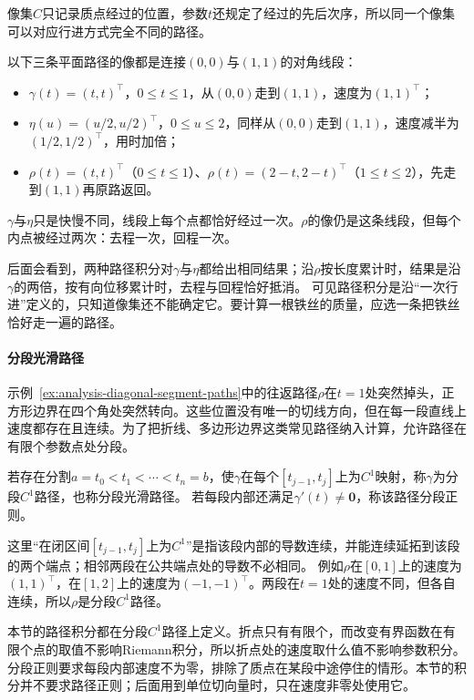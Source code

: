 像集$C$只记录质点经过的位置，参数$t$还规定了经过的先后次序，所以同一个像集可以对应行进方式完全不同的路径。
\begin{example}[同一条对角线段上的三条路径]
\label{ex:analysis-diagonal-segment-paths}
以下三条平面路径的像都是连接$(0,0)$与$(1,1)$的对角线段：
\begin{itemize}
 \item $\gamma(t)=(t,t)^\top$，$0\leq t\leq1$，从$(0,0)$走到$(1,1)$，速度为$(1,1)^\top$；
 \item $\eta(u)=(u/2,u/2)^\top$，$0\leq u\leq2$，同样从$(0,0)$走到$(1,1)$，速度减半为$(1/2,1/2)^\top$，用时加倍；
 \item $\rho(t)=(t,t)^\top$（$0\leq t\leq1$）、$\rho(t)=(2-t,2-t)^\top$（$1\leq t\leq2$），先走到$(1,1)$再原路返回。
\end{itemize}
$\gamma$与$\eta$只是快慢不同，线段上每个点都恰好经过一次。$\rho$的像仍是这条线段，但每个内点被经过两次：去程一次，回程一次。
\end{example}

后面会看到，两种路径积分对$\gamma$与$\eta$都给出相同结果；沿$\rho$按长度累计时，结果是沿$\gamma$的两倍，按有向位移累计时，去程与回程恰好抵消。
可见路径积分是沿“一次行进”定义的，只知道像集还不能确定它。要计算一根铁丝的质量，应选一条把铁丝恰好走一遍的路径。

\paragraph{分段光滑路径}

示例~\ref{ex:analysis-diagonal-segment-paths}中的往返路径$\rho$在$t=1$处突然掉头，正方形边界在四个角处突然转向。这些位置没有唯一的切线方向，但在每一段直线上速度都存在且连续。为了把折线、多边形边界这类常见路径纳入计算，允许路径在有限个参数点处分段。
\begin{definition}[分段光滑路径]
若存在分割$a=t_0<t_1<\cdots<t_n=b$，使$\gamma$在每个$[t_{j-1},t_j]$上为$C^1$映射，称$\gamma$为分段$C^1$路径，也称分段光滑路径。
若每段内部还满足$\gamma'(t)\neq\bm0$，称该路径分段正则。
\end{definition}

这里“在闭区间$[t_{j-1},t_j]$上为$C^1$”是指该段内部的导数连续，并能连续延拓到该段的两个端点；相邻两段在公共端点处的导数不必相同。
例如$\rho$在$[0,1]$上的速度为$(1,1)^\top$，在$[1,2]$上的速度为$(-1,-1)^\top$。两段在$t=1$处的速度不同，但各自连续，所以$\rho$是分段$C^1$路径。

本节的路径积分都在分段$C^1$路径上定义。折点只有有限个，而改变有界函数在有限个点的取值不影响Riemann积分，所以折点处的速度取什么值不影响参数积分。
分段正则要求每段内部速度不为零，排除了质点在某段中途停住的情形。本节的积分并不要求路径正则；后面用到单位切向量时，只在速度非零处使用它。

